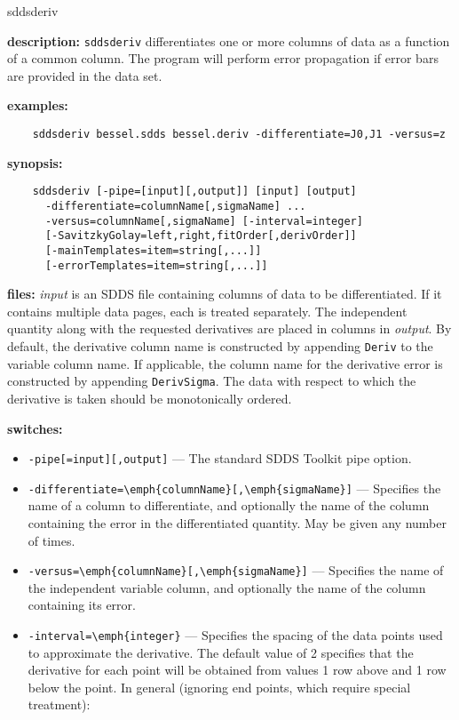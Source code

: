 \begin{sddsprog}{sddsderiv}
  \item {\bf description:} \verb|sddsderiv| differentiates one or more columns of data as a function of a common column. The program will perform error propagation if error bars are provided in the data set.
  \item {\bf examples:}
    \begin{verbatim}
    sddsderiv bessel.sdds bessel.deriv -differentiate=J0,J1 -versus=z
    \end{verbatim}
  \item {\bf synopsis:}
    \begin{verbatim}
    sddsderiv [-pipe=[input][,output]] [input] [output]
      -differentiate=columnName[,sigmaName] ...
      -versus=columnName[,sigmaName] [-interval=integer]
      [-SavitzkyGolay=left,right,fitOrder[,derivOrder]]
      [-mainTemplates=item=string[,...]]
      [-errorTemplates=item=string[,...]]
    \end{verbatim}
  \item {\bf files:} {\em input} is an SDDS file containing columns of data to be differentiated. If it contains multiple data pages, each is treated separately. The independent quantity along with the requested derivatives are placed in columns in {\em output}. By default, the derivative column name is constructed by appending \verb|Deriv| to the variable column name. If applicable, the column name for the derivative error is constructed by appending \verb|DerivSigma|. The data with respect to which the derivative is taken should be monotonically ordered.
  \item {\bf switches:}
    \begin{itemize}
      \item \verb|-pipe[=input][,output]| --- The standard SDDS Toolkit pipe option.
      \item \verb|-differentiate=\emph{columnName}[,\emph{sigmaName}]| --- Specifies the name of a column to differentiate, and optionally the name of the column containing the error in the differentiated quantity. May be given any number of times.
      \item \verb|-versus=\emph{columnName}[,\emph{sigmaName}]| --- Specifies the name of the independent variable column, and optionally the name of the column containing its error.
      \item \verb|-interval=\emph{integer}| --- Specifies the spacing of the data points used to approximate the derivative. The default value of 2 specifies that the derivative for each point will be obtained from values 1 row above and 1 row below the point. In general (ignoring end points, which require special treatment):

\end{itemize}
\end{sddsprog}
